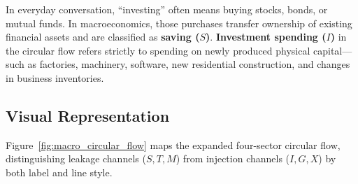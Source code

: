 \documentclass[11pt,letterpaper]{article}
\begin{document}
\begin{tcolorbox}[colback=LightTerracotta,colframe=CourseOrange,title=\textbf{Clear It Up: Economic Investment ($I$) vs. Financial Investing}]
In everyday conversation, ``investing'' often means buying stocks, bonds, or mutual funds. In macroeconomics, those purchases transfer ownership of existing financial assets and are classified as \textbf{saving ($S$)}. \textbf{Investment spending ($I$)} in the circular flow refers strictly to spending on newly produced physical capital---such as factories, machinery, software, new residential construction, and changes in business inventories.
\end{tcolorbox}

\subsection*{Visual Representation}
Figure~\ref{fig:macro_circular_flow} maps the expanded four-sector circular flow, distinguishing leakage channels ($S, T, M$) from injection channels ($I, G, X$) by both label and line style.
\end{document}
